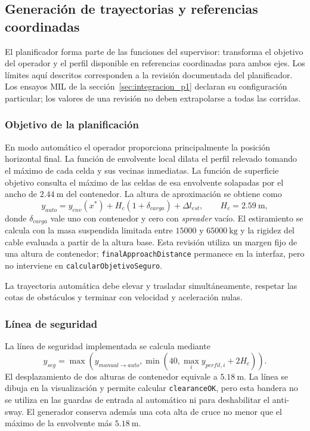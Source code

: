 \documentclass[a4paper,10pt,onecolumn,journal]{ieeeconf}
\numberwithin{equation}{section}
\begin{document}

\subsection{Generación de trayectorias y referencias coordinadas}
\label{subsec:trayectorias_supervisor}
El planificador forma parte de las funciones del supervisor: transforma el objetivo del operador y el perfil disponible en referencias coordinadas para ambos ejes. Los límites aquí descritos corresponden a la revisión documentada del planificador. Los ensayos MIL de la sección~\ref{sec:integracion_p1} declaran su configuración particular; los valores de una revisión no deben extrapolarse a todas las corridas.


\subsubsection{Objetivo de la planificación}
En modo automático el operador proporciona principalmente la posición horizontal final. La función de envolvente local dilata el perfil relevado tomando el máximo de cada celda y sus vecinas inmediatas. La función de superficie objetivo consulta el máximo de las celdas de esa envolvente solapadas por el ancho de $2.44~\mathrm{m}$ del contenedor. La altura de aproximación se obtiene como
\begin{equation}
y_{auto}=y_{env}(x^*)+H_c(1+\delta_{carga})+\Delta l_{est},\qquad H_c=2.59~\mathrm{m},
\label{eq:objetivo_local_vigente}
\end{equation}
donde $\delta_{carga}$ vale uno con contenedor y cero con \textit{spreader} vacío. El estiramiento se calcula con la masa suspendida limitada entre $15000$ y $65000~\mathrm{kg}$ y la rigidez del cable evaluada a partir de la altura base. Esta revisión utiliza un margen fijo de una altura de contenedor; \texttt{finalApproachDistance} permanece en la interfaz, pero no interviene en \texttt{calcularObjetivoSeguro}.

La trayectoria automática debe elevar y trasladar simultáneamente, respetar las cotas de obstáculos y terminar con velocidad y aceleración nulas.




\subsubsection{Línea de seguridad}
La línea de seguridad implementada se calcula mediante
\begin{equation}
y_{seg}=\max\left(y_{manual\rightarrow auto},\min(40,\max_i y_{perfil,i}+2H_c)\right).
\label{eq:safetyline}
\end{equation}
El desplazamiento de dos alturas de contenedor equivale a $5.18~\mathrm{m}$. La línea se dibuja en la visualización y permite calcular \texttt{clearanceOK}, pero esta bandera no se utiliza en las guardas de entrada al automático ni para deshabilitar el anti-sway. El generador conserva además una cota alta de cruce no menor que el máximo de la envolvente más $5.18~\mathrm{m}$.
\end{document}

